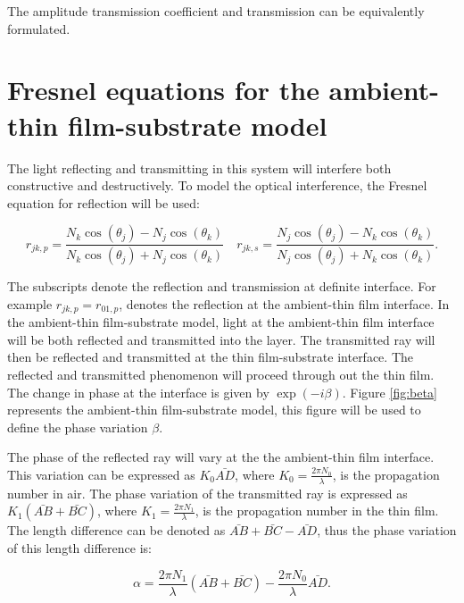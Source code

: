 \documentclass[MasterThesisMain.tex]{subfiles}
\begin{document}
The amplitude transmission coefficient and transmission can be equivalently formulated.

\section{Fresnel equations for the ambient-thin film-substrate model}\label{ch:fresnel2lay}
The light reflecting and transmitting in this system will interfere both constructive and destructively. To model the optical interference, the Fresnel equation for reflection will be used:

\begin{equation}
r_{jk,p} = \frac{N_k\cos(\theta_j)-N_j\cos(\theta_k)}{N_k\cos(\theta_j)+N_j\cos(\theta_k)} \quad r_{jk,s} = \frac{N_j\cos(\theta_j)-N_k\cos(\theta_k)}{N_j\cos(\theta_j)+N_k\cos(\theta_k)}.
\end{equation}

The subscripts denote the reflection and transmission at definite interface. For example $r_{jk,p} = r_{01,p}$, denotes the reflection at the ambient-thin film interface. In the ambient-thin film-substrate model, light at the ambient-thin film interface will be both reflected and transmitted into the layer. The transmitted ray will then be reflected and transmitted at the thin film-substrate interface. The reflected and transmitted phenomenon will proceed through out the thin film. The change in phase at the interface is given by $\exp(-i\beta)$. Figure \ref{fig:beta} represents the ambient-thin film-substrate model, this figure will be used to define the phase variation $\beta$.

The phase of the reflected ray will vary at the the ambient-thin film interface. This variation can be expressed as $K_0\bar{AD}$, where $K_0=\frac{2\pi N_0}{\lambda}$, is the propagation number in air. The phase variation of the transmitted ray is expressed as $K_1(\bar{AB} + \bar{BC})$, where $K_1=\frac{2\pi N_1}{\lambda}$, is the propagation number in the thin film. The length difference can be denoted as $\bar{AB} + \bar{BC} - \bar{AD}$, thus the phase variation of this length difference is:

\begin{equation}\label{eq:phasealpha}
\alpha = \frac{2\pi N_1}{\lambda}(\bar{AB} + \bar{BC}) - \frac{2\pi N_0}{\lambda}\bar{AD}.
\end{equation}
\end{document}
